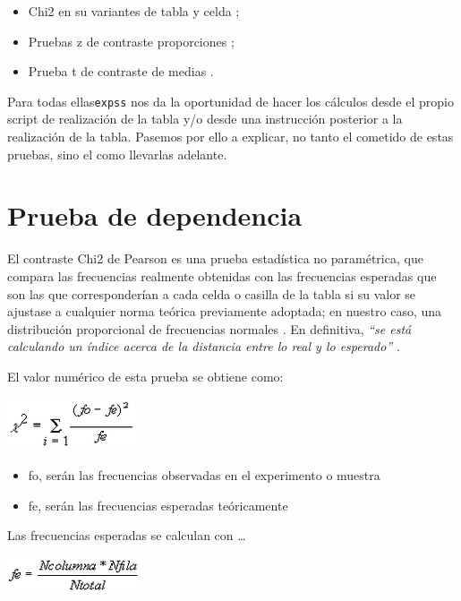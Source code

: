 \documentclass[
]{book}
\providecommand{\tightlist}{%
  \setlength{\itemsep}{0pt}\setlength{\parskip}{0pt}}
\begin{document}
\begin{itemize}
\tightlist
\item
  Chi2 en su variantes de tabla y celda \citep[ ]{art001, amon2009estadistica};
\item
  Pruebas z de contraste proporciones \citep[ ]{amon2009estadistica, glass1986metodos};
\item
  Prueba t de contraste de medias \citep[ ]{amon2009estadistica, glass1986metodos}.
\end{itemize}

Para todas ellas\texttt{expss} nos da la oportunidad de hacer los cálculos desde el propio script de realización de la tabla y/o desde una instrucción posterior a la realización de la tabla. Pasemos por ello a explicar, no tanto el cometido de estas pruebas, sino el como llevarlas adelante.

\hypertarget{prueba-de-dependencia}{%
\section{Prueba de dependencia}\label{prueba-de-dependencia}}

El contraste Chi2 de Pearson es una prueba estadística no paramétrica, que compara las frecuencias realmente obtenidas con las frecuencias esperadas que son las que corresponderían a cada celda o casilla de la tabla si su valor se ajustase a cualquier norma teórica previamente adoptada; en nuestro caso, una distribución proporcional de frecuencias normales \citet{siegel1995estadistica}. En definitiva, \emph{``se está calculando un índice acerca de la distancia entre lo real y lo esperado''} \citet{manzano1995}.

El valor numérico de esta prueba se obtiene como:

\includegraphics{data/embim12.png}

\begin{itemize}
\tightlist
\item
  fo, serán las frecuencias observadas en el experimento o muestra
\item
  fe, serán las frecuencias esperadas teóricamente
\end{itemize}

Las frecuencias esperadas se calculan con \ldots{}

\includegraphics{data/embim13.png}
\end{document}
